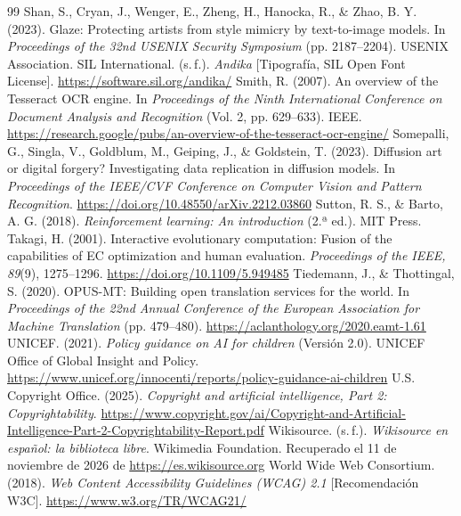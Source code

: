 \documentclass[10pt,a4paper,twocolumn]{article}
\begin{document}
{\begin{thebibliography}{99}
 Shan, S., Cryan, J., Wenger, E., Zheng, H., Hanocka, R., \& Zhao, B. Y. (2023). Glaze: Protecting artists from style mimicry by text-to-image models. In \emph{Proceedings of the 32nd USENIX Security Symposium} (pp. 2187--2204). USENIX Association.
 SIL International. (s.\,f.). \emph{Andika} [Tipografía, SIL Open Font License]. \url{https://software.sil.org/andika/}
 Smith, R. (2007). An overview of the Tesseract OCR engine. In \emph{Proceedings of the Ninth International Conference on Document Analysis and Recognition} (Vol. 2, pp. 629--633). IEEE. \url{https://research.google/pubs/an-overview-of-the-tesseract-ocr-engine/}
 Somepalli, G., Singla, V., Goldblum, M., Geiping, J., \& Goldstein, T. (2023). Diffusion art or digital forgery? Investigating data replication in diffusion models. In \emph{Proceedings of the IEEE/CVF Conference on Computer Vision and Pattern Recognition}. \url{https://doi.org/10.48550/arXiv.2212.03860}
 Sutton, R. S., \& Barto, A. G. (2018). \emph{Reinforcement learning: An introduction} (2.ª ed.). MIT Press.
 Takagi, H. (2001). Interactive evolutionary computation: Fusion of the capabilities of EC optimization and human evaluation. \emph{Proceedings of the IEEE, 89}(9), 1275--1296. \url{https://doi.org/10.1109/5.949485}
 Tiedemann, J., \& Thottingal, S. (2020). OPUS-MT: Building open translation services for the world. In \emph{Proceedings of the 22nd Annual Conference of the European Association for Machine Translation} (pp. 479--480). \url{https://aclanthology.org/2020.eamt-1.61}
 UNICEF. (2021). \emph{Policy guidance on AI for children} (Versión 2.0). UNICEF Office of Global Insight and Policy. \url{https://www.unicef.org/innocenti/reports/policy-guidance-ai-children}
 U.S. Copyright Office. (2025). \emph{Copyright and artificial intelligence, Part 2: Copyrightability}. \url{https://www.copyright.gov/ai/Copyright-and-Artificial-Intelligence-Part-2-Copyrightability-Report.pdf}
 Wikisource. (s.\,f.). \emph{Wikisource en español: la biblioteca libre}. Wikimedia Foundation. Recuperado el 11 de noviembre de 2026 de \url{https://es.wikisource.org}
 World Wide Web Consortium. (2018). \emph{Web Content Accessibility Guidelines (WCAG) 2.1} [Recomendación W3C]. \url{https://www.w3.org/TR/WCAG21/}

\end{thebibliography}}
\end{document}
